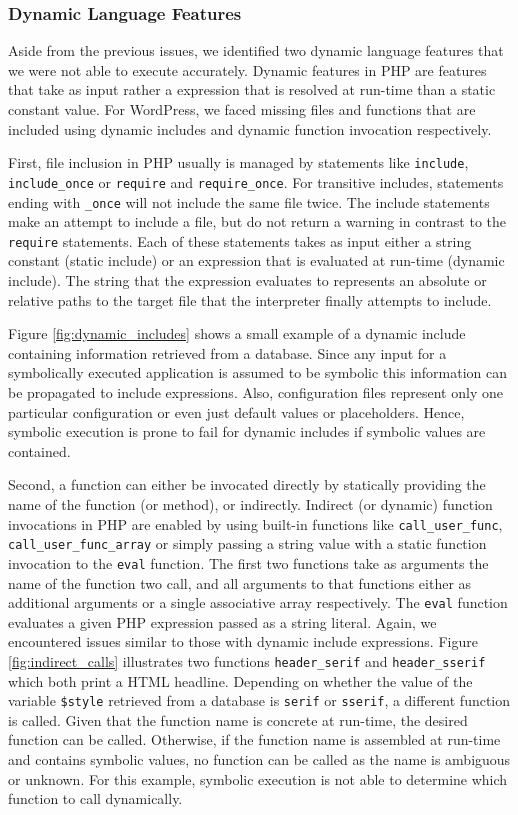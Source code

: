 \documentclass[sigconf, preprint]{acmart}
\renewcommand{\sf}[1]{\textsf{#1}}
\renewcommand{\tt}[1]{\texttt{#1}}
\begin{document}
\subsubsection{Dynamic Language Features}
\label{sec:experiment_dynamicfeatures} 
Aside from the previous issues, we identified two dynamic language features
that we were not able to execute accurately. Dynamic features in PHP are
features that take as input rather a expression that is resolved at run-time
than a static constant value. For \sf{WordPress}, we faced missing files and
functions that are included using dynamic includes and dynamic function
invocation respectively.

First, file inclusion in PHP usually is managed by statements like \tt{include},
\tt{include\_once} or \tt{require} and \tt{require\_once}. For transitive
includes, statements ending with \tt{\_once} will not include the same file
twice. The include statements make an attempt to include a file, but do not
return a warning in contrast to the \tt{require} statements. Each of these
statements takes as input either a string constant (static include) or an
expression that is evaluated at run-time (dynamic include). The string that the
expression evaluates to represents an absolute or relative paths to the target
file that the interpreter finally attempts to include.

Figure \ref{fig:dynamic_includes} shows a small example of a dynamic include containing
information retrieved from a database. Since any input for a symbolically
executed application is assumed to be symbolic this information can be
propagated to include expressions. Also, configuration files represent only one particular
configuration or even just default values or placeholders. Hence, symbolic
execution is prone to fail for dynamic includes if symbolic values are
contained.

Second, a function can either be invocated directly by statically providing the
name of the function (or method), or indirectly. Indirect (or dynamic) function
invocations in PHP are enabled by using built-in functions like
\tt{call\_user\_func}, \tt{call\_user\_func\_array} or simply passing a string
value with a static function invocation to the \tt{eval} function. The first two
functions take as arguments the name of the function two call, and all arguments to that
functions either as additional arguments or a single associative array
respectively.
The \tt{eval} function evaluates a given PHP expression passed as a string
literal.
Again, we encountered issues similar to those with dynamic include expressions.
Figure \ref{fig:indirect_calls} illustrates two functions \tt{header\_serif}
and \tt{header\_sserif} which both print a HTML headline. Depending on whether
the value of the variable \tt{\$style} retrieved from a database is \tt{serif}
or \tt{sserif}, a different function is called. Given that the function name is
concrete at run-time, the desired function can be called. Otherwise, if the
function name is assembled at run-time and contains symbolic values, no
function can be called as the name is ambiguous or unknown. For this example,
symbolic execution is not able to determine which function to call dynamically.
\end{document}
